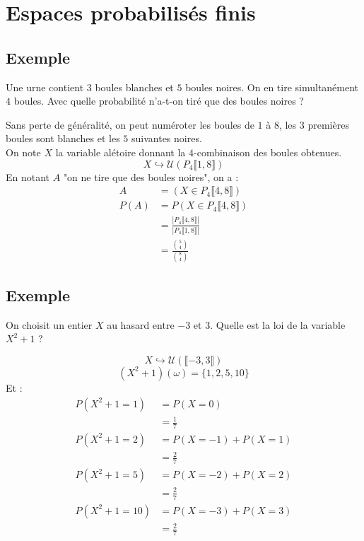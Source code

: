 \documentclass[../main.tex]{subfiles}
\begin{document}
\setcounter{chapter}{31}
\chapter{Espaces probabilisés finis}
\tableofcontents
\newpage

\section{Exemple}
\begin{tcolorbox}[title=Exemple 32.19, title filled=false, colframe=darkgreen, colback=darkgreen!10!white]
    Une urne contient $3$ boules blanches et $5$ boules noires. On en tire simultanément $4$ boules. Avec quelle probabilité n'a-t-on tiré que des boules noires ?
\end{tcolorbox}

\noindent Sans perte de généralité, on peut numéroter les boules de $1$ à $8$, les $3$ premières boules sont blanches et les $5$ suivantes noires. \\
On note $X$ la variable alétoire donnant la $4$-combinaison des boules obtenues. \\
$$X\hookrightarrow \mathcal{U}(P_4 \llbracket 1, 8 \rrbracket)$$
En notant $A$ "on ne tire que des boules noires", on a :
\begin{align*}
    A &= (X\in P_4 \llbracket 4, 8 \rrbracket) \\
    P(A) &= P(X\in P_4 \llbracket 4, 8 \rrbracket) \\
    &= \frac{|P_4 \llbracket 4, 8 \rrbracket|}{|P_4 \llbracket 1, 8 \rrbracket|} \\
    &= \frac{\binom{5}{4}}{\binom{8}{4}}
\end{align*}

\section{Exemple}
\begin{tcolorbox}[title=Exemple 32.25, title filled=false, colframe=darkgreen, colback=darkgreen!10!white]
    On choisit un entier $X$ au hasard entre $-3$ et $3$. Quelle est la loi de la variable $X^2 + 1$ ?
\end{tcolorbox}
$$X\hookrightarrow \mathcal{U}(\llbracket -3, 3 \rrbracket)$$
$$(X^2 + 1)(\omega) = \{ 1, 2, 5, 10 \}$$
Et : 
\begin{align*}
    P(X^2 + 1 = 1) &= P(X = 0) \\
    &= \frac{1}{7} \\
    P(X^2 + 1 = 2) &= P(X = -1) + P(X = 1) \\
    &= \frac{2}{7} \\
    P(X^2 + 1 = 5) &= P(X = -2) + P(X = 2) \\
    &= \frac{2}{7} \\
    P(X^2 + 1 = 10) &= P(X = -3) + P(X = 3) \\
    &= \frac{2}{7}
\end{align*}
\end{document}
